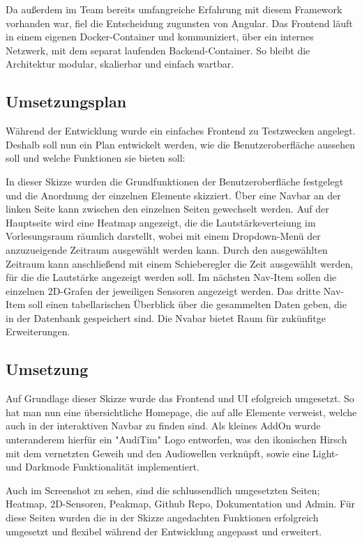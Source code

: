 Da außerdem im Team bereits umfangreiche Erfahrung mit diesem Framework vorhanden war, fiel die Entscheidung zugunsten von Angular.
Das Frontend läuft in einem eigenen Docker-Container und kommuniziert, über ein internes Netzwerk, mit dem separat laufenden Backend-Container. 
So bleibt die Architektur modular, skalierbar und einfach wartbar.

\subsection{Umsetzungsplan}
Während der Entwicklung wurde ein einfaches Frontend zu Testzwecken angelegt. 
Deshalb soll nun ein Plan entwickelt werden, wie die Benutzeroberfläche aussehen soll und welche Funktionen sie bieten soll:
\begin{center}
\end{center}
In dieser Skizze wurden die Grundfunktionen der Benutzeroberfläche festgelegt und die Anordnung der einzelnen Elemente skizziert.
Über eine Navbar an der linken Seite kann zwischen den einzelnen Seiten gewechselt werden. 
Auf der Hauptseite wird eine Heatmap angezeigt, die die Lautstärkeverteiung im Vorlesungsraum räumlich darstellt, wobei mit einem Dropdown-Menü der anzuzueigende Zeitraum ausgewählt werden kann.
Durch den ausgewählten Zeitraum kann anschließend mit einem Schieberegler die Zeit ausgewählt werden, für die die Lautstärke angezeigt werden soll.
Im nächsten Nav-Item sollen die einzelnen 2D-Grafen der jeweiligen Sensoren angezeigt werden. 
Das dritte Nav-Item soll einen tabellarischen Überblick über die gesammelten Daten geben, die in der Datenbank gespeichert sind.
Die Nvabar bietet Raum für zukünfitge Erweiterungen.

\subsection{Umsetzung}
Auf Grundlage dieser Skizze wurde das Frontend und UI efolgreich umgesetzt.
So hat man nun eine übersichtliche Homepage, die auf alle Elemente verweist, welche auch in der interaktiven Navbar zu finden sind.
Als kleines AddOn wurde unteranderem hierfür ein "AudiTim" Logo entworfen, was den ikonischen Hirsch mit dem vernetzten Geweih und den Audiowellen verknüpft, sowie eine Light- und Darkmode Funktionalität implementiert.
\begin{center}
\end{center}

Auch im Screenshot zu sehen, sind die schlussendlich umgesetzten Seiten; Heatmap, 2D-Sensoren, Peakmap, Github Repo, Dokumentation und Admin. 
Für diese Seiten wurden die in der Skizze angedachten Funktionen erfolgreich umgesetzt und flexibel während der Entwicklung angepasst und erweitert.

